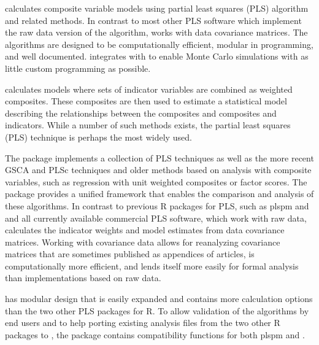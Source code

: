 \documentclass[a4paper]{book}
\begin{document}
%
\begin{Description}\relax
{} calculates composite variable models using partial least squares (PLS)
algorithm and related methods. In contrast to most other PLS software which implement
the raw data version of the algorithm,  works with data covariance matrices. The 
algorithms are designed to be computationally efficient, modular in programming, and well documented.
 integrates with  to enable Monte Carlo simulations with as little custom
programming as possible.
\end{Description}
%
\begin{Details}\relax
{} calculates models where sets of indicator variables are combined as weighted composites. 
These composites are then used to estimate a statistical model describing the relationships between
the composites and composites and indicators. While a number of such methods exists, the partial
least squares (PLS) technique is perhaps the most widely used.

The  package implements a collection of PLS techniques as well as the more recent 
GSCA and PLSc techniques and older methods based on analysis with composite variables,
such as regression with
unit weighted composites or factor scores. The package provides a unified
framework that enables the comparison and analysis of these algorithms. In contrast to previous R
packages for PLS, such as plspm and  and all currently
available commercial PLS software, which work with
raw data,  calculates the indicator weights and model estimates from data covariance 
matrices. Working with covariance data allows for reanalyzing covariance matrices that are sometimes
published as appendices of articles, is computationally more efficient, and lends itself more easily
for formal analysis than implementations based on raw data. 

 has modular design that is easily expanded and contains more calculation options
than the two other PLS packages for R. To allow validation of the algorithms by end users
and to help porting existing analysis files from the two other R packages to 
, the package contains compatibility functions for both plspm and .


\end{Details}
\end{document}
